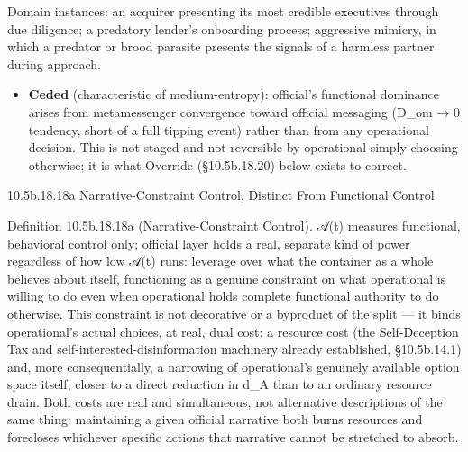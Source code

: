 \documentclass[
]{article}
\begin{document}
Domain instances: an acquirer presenting its most credible executives
through due diligence; a predatory lender's onboarding process;
aggressive mimicry, in which a predator or brood parasite presents the
signals of a harmless partner during approach.

\begin{itemize}
\item
  \textbf{Ceded} (characteristic of medium-entropy): official's
  functional dominance arises from metamessenger convergence toward
  official messaging (D\_om → 0 tendency, short of a full tipping event)
  rather than from any operational decision. This is not staged and not
  reversible by operational simply choosing otherwise; it is what
  Override (§10.5b.18.20) below exists to correct.
\end{itemize}

10.5b.18.18a Narrative-Constraint Control, Distinct From Functional
Control

Definition 10.5b.18.18a (Narrative-Constraint Control). 𝒜(t) measures
functional, behavioral control only; official layer holds a real,
separate kind of power regardless of how low 𝒜(t) runs: leverage over
what the container as a whole believes about itself, functioning as a
genuine constraint on what operational is willing to do even when
operational holds complete functional authority to do otherwise. This
constraint is not decorative or a byproduct of the split --- it binds
operational's actual choices, at real, dual cost: a resource cost (the
Self-Deception Tax and self-interested-disinformation machinery already
established, §10.5b.14.1) and, more consequentially, a narrowing of
operational's genuinely available option space itself, closer to a
direct reduction in d\_A than to an ordinary resource drain. Both costs
are real and simultaneous, not alternative descriptions of the same
thing: maintaining a given official narrative both burns resources and
forecloses whichever specific actions that narrative cannot be stretched
to absorb.
\end{document}
